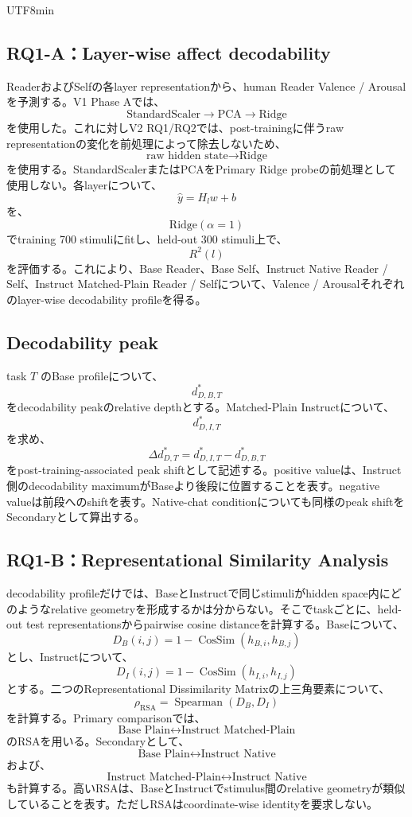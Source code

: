 \documentclass{article} %
\begin{document}
\begin{CJK*}{UTF8}{min}
\subsection{RQ1-A：Layer-wise affect decodability}

ReaderおよびSelfの各layer representationから、human Reader Valence / Arousalを予測する。V1 Phase Aでは、
\[
\text{StandardScaler}
\rightarrow
\text{PCA}
\rightarrow
\text{Ridge}
\]
を使用した。これに対しV2 RQ1/RQ2では、post-trainingに伴うraw representationの変化を前処理によって除去しないため、
\[
\text{raw hidden state}
\rightarrow
\text{Ridge}
\]
を使用する。StandardScalerまたはPCAをPrimary Ridge probeの前処理として使用しない。各layerについて、
\[
\hat y
=
H_lw+b
\]
を、
\[
\text{Ridge}(\alpha=1)
\]
でtraining 700 stimuliにfitし、held-out 300 stimuli上で、
\[
R^2(l)
\]
を評価する。これにより、Base Reader、Base Self、Instruct Native Reader / Self、Instruct Matched-Plain Reader / Selfについて、Valence / Arousalそれぞれのlayer-wise decodability profileを得る。


\subsection{Decodability peak}

task \(T\) のBase profileについて、
\[
d_{D,B,T}^{*}
\]
をdecodability peakのrelative depthとする。Matched-Plain Instructについて、
\[
d_{D,I,T}^{*}
\]
を求め、
\[
\Delta d_{D,T}^{*}
=
d_{D,I,T}^{*}
-
d_{D,B,T}^{*}
\]
をpost-training-associated peak shiftとして記述する。positive valueは、Instruct側のdecodability maximumがBaseより後段に位置することを表す。negative valueは前段へのshiftを表す。Native-chat conditionについても同様のpeak shiftをSecondaryとして算出する。


\subsection{RQ1-B：Representational Similarity Analysis}

decodability profileだけでは、BaseとInstructで同じstimuliがhidden space内にどのようなrelative geometryを形成するかは分からない。そこでtaskごとに、held-out test representationsからpairwise cosine distanceを計算する。Baseについて、
\[
D_B(i,j)
=
1-
\operatorname{CosSim}
(
h_{B,i},
h_{B,j}
)
\]
とし、Instructについて、
\[
D_I(i,j)
=
1-
\operatorname{CosSim}
(
h_{I,i},
h_{I,j}
)
\]
とする。二つのRepresentational Dissimilarity Matrixの上三角要素について、
\[
\rho_{\mathrm{RSA}}
=
\operatorname{Spearman}
(
D_B,
D_I
)
\]を計算する。Primary comparisonでは、
\[
\text{Base Plain}
\leftrightarrow
\text{Instruct Matched-Plain}
\]
のRSAを用いる。Secondaryとして、
\[
\text{Base Plain}
\leftrightarrow
\text{Instruct Native}
\]
および、
\[
\text{Instruct Matched-Plain}
\leftrightarrow
\text{Instruct Native}
\]
も計算する。高いRSAは、BaseとInstructでstimulus間のrelative geometryが類似していることを表す。ただしRSAはcoordinate-wise identityを要求しない。



\end{CJK*}
\end{document}
